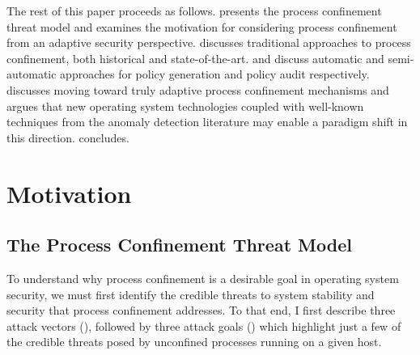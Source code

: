 \documentclass[dvipsnames, 12pt]{article}
\begin{document}
The rest of this paper proceeds as follows.  presents the
process confinement threat model and examines the motivation for considering
process confinement from an adaptive security perspective.
 discusses traditional approaches to process confinement,
both historical and state-of-the-art.  and
 discuss automatic and semi-automatic approaches for
policy generation and policy audit respectively.  discusses
moving toward truly adaptive process confinement mechanisms and argues that new
operating system technologies coupled with well-known techniques from the
anomaly detection literature may enable a paradigm shift in this direction.
 concludes.

\section{Motivation}
\label{sec:motivation}

\subsection{The Process Confinement Threat Model}

To understand why process confinement is a desirable goal in operating system
security, we must first identify the credible threats to system stability and
security that process confinement addresses. To that end, I first describe three
attack vectors (), followed by three attack goals
() which highlight just a few of the credible threats posed
by unconfined processes running on a given host.
\end{document}
